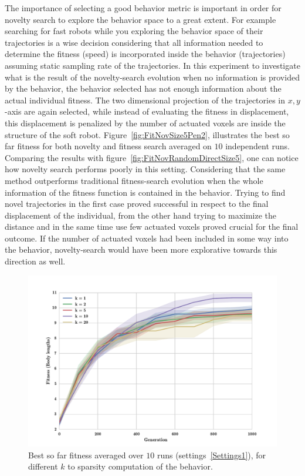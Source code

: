 The importance of selecting a good behavior metric is important in order for novelty search to explore the behavior space to a great extent. For example searching for fast robots while you exploring the behavior space of their trajectories is a wise decision considering that all information needed to determine the fitness (speed) is incorporated inside the behavior (trajectories) assuming static sampling rate of the trajectories. In this experiment to investigate what is the result of the novelty-search evolution when no information is provided by the behavior, the behavior selected has not enough information about the actual individual fitness. The two dimensional projection of the trajectories in $x,y$-axis are again selected, while instead of evaluating the fitness in displacement, this displacement is penalized by the number of actuated voxels are inside the structure of the soft robot. Figure~\ref{fig:FitNovSize5Pen2}, illustrates the best so far fitness for both novelty and fitness search averaged on $10$ independent runs. Comparing the results with figure~\ref{fig:FitNovRandomDirectSize5}, one can notice how novelty search performs poorly in this setting. Considering that the same method outperforms traditional fitness-search evolution when the whole information of the fitness function is contained in the behavior. Trying to find novel trajectories in the first case proved successful in respect to the final displacement of the individual, from the other hand trying to maximize the distance and in the same time use few actuated voxels proved crucial for the final outcome. If the number of actuated voxels had been included in some way into the behavior, novelty-search would have been more explorative towards this direction as well.


\begin{figure}
\centering
\includegraphics[width=1.0\textwidth]{../Figures/Results/KnnExperimentSize5.pdf}
\caption{Best so far fitness averaged over $10$ runs (settings~\ref{Settings1}), for different $k$ to sparsity computation of the behavior.}
\label{fig:KnnExperimentSize5}
\end{figure}

